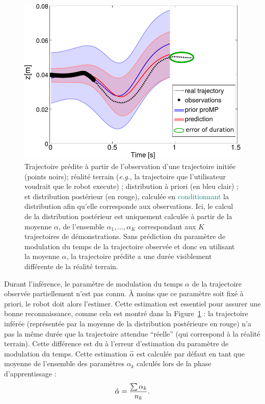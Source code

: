 \documentclass[utf8]{frontiersSCNS} %
\newcommand{\toimprove}[1]{\textcolor{teal}{#1}}
\newcommand{\todo}[1]{\textcolor{red}{\textbf{/*#1*/}}}
\begin{document}
\begin{figure}[h!]
\centering
\includegraphics[width=13cm]{img/mean_alpha_errV2.pdf}
\caption{Trajectoire prédite à partir de l'observation d'une trajectoire initiée (points noirs); réalité terrain (\textit{e.g.}, la trajectoire que l'utilisateur voudrait que le robot execute) ; distribution à priori (en bleu clair) ; et distribution postérieur (en rouge), calculée en \toimprove{conditionnant} la distribution afin qu'elle corresponde aux observations. Ici, le calcul de la distribution postérieur est uniquement calculée à partir de la moyenne $\alpha$, de l'ensemble $\alpha_1, \ldots, \alpha_K$ correspondant aux $K$ trajectoires de démonstrations. Sans prédiction du paramètre de modulation du temps de la trajectoire observée et donc en utilisant la moyenne $\alpha$, la trajectoire prédite a une durée visiblement différente de la réalité terrain.}

\label{fig:meanAlpha}
\end{figure}

Durant l'inférence, le paramètre de modulation du temps $\alpha$ de la trajectoire observée partiellement n'est pas connu. À moins que ce paramètre soit fixé à priori, le robot doit alors l'estimer. Cette estimation est essentiel pour assurer une bonne reconnaissance, comme cela est montré dans la Figure~\ref{fig:meanAlpha} : la trajectoire inférée (représentée par la moyenne de la distribution postérieure en rouge) 
n'a pas la même durée que la trajectoire attendue ``réelle'' (qui correspond à la réalité terrain). Cette différence est du à l'erreur d'estimation du paramètre de modulation du temps. Cette estimation $\hat{\alpha}$  est calculée par défaut en tant que moyenne de l'ensemble des paramètres $\alpha_k$ calculés lors de la phase d'apprentissage :
\begin{equation}
\label{eq:avg}
\hat{\alpha} = {{\sum \alpha_k} \over n_k} .
\end{equation}
\end{document}
